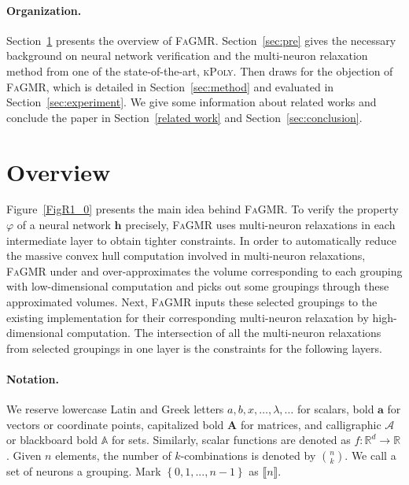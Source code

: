 \documentclass[runningheads]{llncs}
\newcommand{\ourtool}{\textsc{FaGMR}\xspace}
\newcommand{\krelu}{\textsc{kPoly}\xspace}
\newcommand{\myvec}[1]{\boldsymbol{#1}}
\newcommand{\mymatrix}[1]{\boldsymbol{#1}}
\newcommand{\combin}[2]{\binom{#1}{#2}}
\begin{document}
\paragraph{Organization.}
Section~\ref{overview} presents the overview of \ourtool.
Section~\ref{sec:pre} gives the necessary background on neural network
verification and the multi-neuron relaxation method from one of the state-of-the-art, \krelu. Then draws for the objection of \ourtool, which is
detailed in Section~\ref{sec:method} and evaluated in
Section~\ref{sec:experiment}. We give some information about related works and conclude the paper in
Section~\ref{related work} and Section~\ref{sec:conclusion}.


\section{Overview}\label{overview}

Figure~\ref{FigR1_0} presents the main idea behind \ourtool. To verify the property $\varphi$ of a neural network $\myvec{h}$ precisely, \ourtool uses multi-neuron relaxations in each intermediate layer to obtain tighter constraints. In order to automatically reduce the massive convex hull computation involved in multi-neuron relaxations, \ourtool under and over-approximates the volume corresponding to each grouping with low-dimensional computation and picks out some groupings through these approximated volumes. Next, \ourtool inputs these selected groupings to the existing implementation for their corresponding multi-neuron relaxation by high-dimensional computation. The intersection of all the multi-neuron relaxations from selected groupings in one layer is the constraints for the following layers.
%
%
%

\paragraph{Notation.} 
We reserve lowercase Latin and Greek letters $a, b, x, \dots, \lambda,
\dots$ for scalars, bold $\myvec{a}$ for vectors or coordinate points, capitalized bold
$\mymatrix{A}$ for matrices, and calligraphic $\mathcal{A}$ or
blackboard bold $\mathbb{A}$ for sets.  Similarly, scalar functions
are denoted as $f:\mathbb{R}^{d} \to \mathbb{R}$. 
Given $n$ elements, the number of $k$-combinations is
denoted by $\combin{n}{k}$. We call a set of neurons a grouping.
Mark $\left\{ 0,1,...,n-1 \right\}$ as $\llbracket   n  \rrbracket $.
%
%
%
\end{document}
